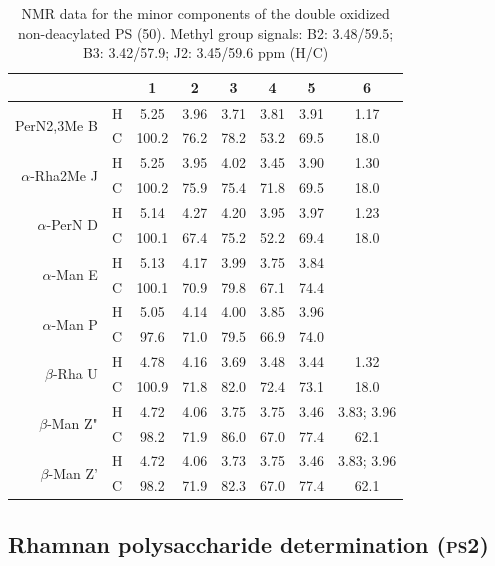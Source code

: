 		 \begin{table}[htb]
			 \centering
			 \caption[\Ac{NMR} data for the minor components of the double oxidized non-deacylated \ac{PS}]{\ac{NMR} data for the minor components of the double oxidized non-deacylated \ac{PS} (50\cel). Methyl group signals: B2: 3.48/59.5; B3: 3.42/57.9; J2: 3.45/59.6 ppm (H/C)}
			 \label{tbl:lpsends}
			 \begin{tabular}{@{}rccccccc@{}}
				 \toprule
				  &  & 1 & 2 & 3 & 4 & 5 & 6 \\ \midrule
				 \multirow{2}{*}{PerN2,3Me B} & H & 5.25 & 3.96 & 3.71 & 3.81 & 3.91 & 1.17 \\
				  & C & 100.2 & 76.2 & 78.2 & 53.2 & 69.5 & 18.0 \\
				 \multirow{2}{*}{$\alpha$-Rha2Me J} & H & 5.25 & 3.95 & 4.02 & 3.45 & 3.90 & 1.30 \\
				  & C & 100.2 & 75.9 & 75.4 & 71.8 & 69.5 & 18.0 \\
				 \multirow{2}{*}{$\alpha$-PerN D} & H & 5.14 & 4.27 & 4.20 & 3.95 & 3.97 & 1.23 \\
				  & C & 100.1 & 67.4 & 75.2 & 52.2 & 69.4 & 18.0 \\
				 \multirow{2}{*}{$\alpha$-Man E} & H & 5.13 & 4.17 & 3.99 & 3.75 & 3.84 &  \\
				  & C & 100.1 & 70.9 & 79.8 & 67.1 & 74.4 &  \\
				 \multirow{2}{*}{$\alpha$-Man P} & H & 5.05 & 4.14 & 4.00 & 3.85 & 3.96 &  \\
				  & C & 97.6 & 71.0 & 79.5 & 66.9 & 74.0 &  \\
				 \multirow{2}{*}{$\beta$-Rha U} & H & 4.78 & 4.16 & 3.69 & 3.48 & 3.44 & 1.32 \\
				  & C & 100.9 & 71.8 & 82.0 & 72.4 & 73.1 & 18.0 \\
				 \multirow{2}{*}{$\beta$-Man Z"} & H & 4.72 & 4.06 & 3.75 & 3.75 & 3.46 & 3.83; 3.96 \\
				  & C & 98.2 & 71.9 & 86.0 & 67.0 & 77.4 & 62.1 \\
				 \multirow{2}{*}{$\beta$-Man Z'} & H & 4.72 & 4.06 & 3.73 & 3.75 & 3.46 & 3.83; 3.96 \\
				  & C & 98.2 & 71.9 & 82.3 & 67.0 & 77.4 & 62.1 \\ \bottomrule 
			 \end{tabular}
		 \end{table}

	\subsection{Rhamnan polysaccharide determination (\textsc{ps}2)} %
	\label{sub:rhamnan_polysaccharide_determination_ps2_}

